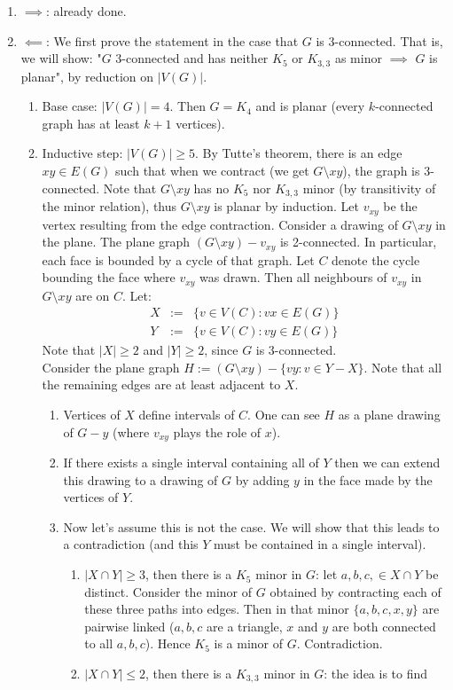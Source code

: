 \documentclass[11pt]{book}
\begin{document}
		\begin{enumerate}
			\item $\implies$: already done.
			\item $\impliedby$: We first prove the statement in the case that $G$ is 3-connected. That is, we will show: "$G$ 3-connected and has neither $K_5$ or $K_{3,3}$ as minor $\implies$ $G$ is planar", by reduction on $|V(G)|$.
				\begin{enumerate}
					\item Base case: $|V(G)| = 4$. Then $G = K_4$ and is planar (every $k$-connected graph has at least $k+1$ vertices).
					\item Inductive step: $|V(G)| \geq 5$. By Tutte's theorem, there is an edge $xy \in E(G)$ such that when we contract (we get $G \setminus xy$), the graph is 3-connected. Note that $G \setminus xy$ has no $K_5$ nor $K_{3,3}$ minor (by transitivity of the minor relation), thus $G \setminus xy$ is planar by induction. Let $v_{xy}$ be the vertex resulting from the edge contraction. Consider a drawing of $G \setminus xy$ in the plane. The plane graph $(G \setminus xy) - v_{xy}$ is 2-connected. In particular, each face is bounded by a cycle of that graph. Let $C$ denote the cycle bounding the face where $v_{xy}$ was drawn. Then all neighbours of $v_{xy}$ in $G \setminus xy$ are on $C$. Let:
						\begin{eqnarray}
							X &:=& \{ v \in V(C) : vx \in E(G)\}\\
							Y &:=& \{ v \in V(C) : vy \in E(G) \}
						\end{eqnarray}
						Note that $|X| \geq 2$ and $|Y| \geq 2$, since $G$ is 3-connected.\\
						
						Consider the plane graph $H := (G \setminus xy) - \{ vy : v \in Y -X \}$. Note that all the remaining edges are at least adjacent to $X$.
						\begin{enumerate}
							\item Vertices of $X$ define intervals of $C$. One can see $H$ as a plane drawing of $G - y$ (where $v_{xy}$ plays the role of $x$).
							\item If there exists a single interval containing all of $Y$ then we can extend this drawing to a drawing  of $G$ by adding $y$ in the face made by the vertices of $Y$.
							\item Now let's assume this is not the case. We will show that this leads to a contradiction (and this $Y$ must be contained in a single interval).
								\begin{enumerate}
									\item $|X \cap Y| \geq 3$, then there is a $K_5$ minor in $G$: let $a,b,c, \in X \cap Y$ be distinct. Consider the minor of $G$ obtained by contracting each of these three paths into edges.  Then in that minor $\{ a,b,c,x,y \}$ are pairwise linked ($a,b,c$ are a triangle, $x$ and $y$ are both connected to all $a,b,c$). Hence $K_5$ is a minor of $G$. Contradiction.
									\item $|X \cap Y| \leq 2$, then there is a $K_{3,3}$ minor in $G$: the idea is to find 
									

\end{enumerate}
\end{enumerate}
\end{enumerate}
\end{enumerate}
\end{document}
